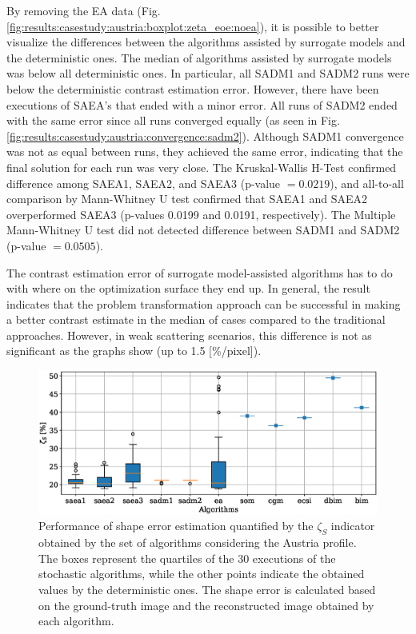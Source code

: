 			By removing the EA data (Fig. \ref{fig:results:casestudy:austria:boxplot:zeta_eoe:noea}), it is possible to better visualize the differences between the algorithms assisted by surrogate models and the deterministic ones. The median of algorithms assisted by surrogate models was below all deterministic ones. In particular, all SADM1 and SADM2 runs were below the deterministic contrast estimation error. However, there have been executions of SAEA's that ended with a minor error. All runs of SADM2 ended with the same error since all runs converged equally (as seen in Fig. \ref{fig:results:casestudy:austria:convergence:sadm2}). Although SADM1 convergence was not as equal between runs, they achieved the same error, indicating that the final solution for each run was very close. The Kruskal-Wallis H-Test confirmed difference among SAEA1, SAEA2, and SAEA3 (p-value $=0.0219$), and all-to-all comparison by Mann-Whitney U test confirmed that SAEA1 and SAEA2 overperformed SAEA3 (p-values 0.0199 and 0.0191, respectively). The Multiple Mann-Whitney U test did not detected difference between SADM1 and SADM2 (p-value $=0.0505$).
			
			The contrast estimation error of surrogate model-assisted algorithms has to do with where on the optimization surface they end up. In general, the result indicates that the problem transformation approach can be successful in making a better contrast estimate in the median of cases compared to the traditional approaches. However, in weak scattering scenarios, this difference is not as significant as the graphs show (up to 1.5 [\%/pixel]).
		
			\begin{figure}
				\centering
				\includegraphics[width=.9\textwidth]{./figuras/casestudy/austria/boxplot_zeta_s}
				\caption[Performance of shape error estimation quantified by the $\zeta_S$ indicator obtained by the set of algorithms considering the Austria profile.]{Performance of shape error estimation quantified by the $\zeta_S$ indicator obtained by the set of algorithms considering the Austria profile. The boxes represent the quartiles of the 30 executions of the stochastic algorithms, while the other points indicate the obtained values by the deterministic ones. The shape error is calculated based on the ground-truth image and the reconstructed image obtained by each algorithm.}
				\label{fig:results:casestudy:austria:boxplot:zeta_s}
			\end{figure}
		
